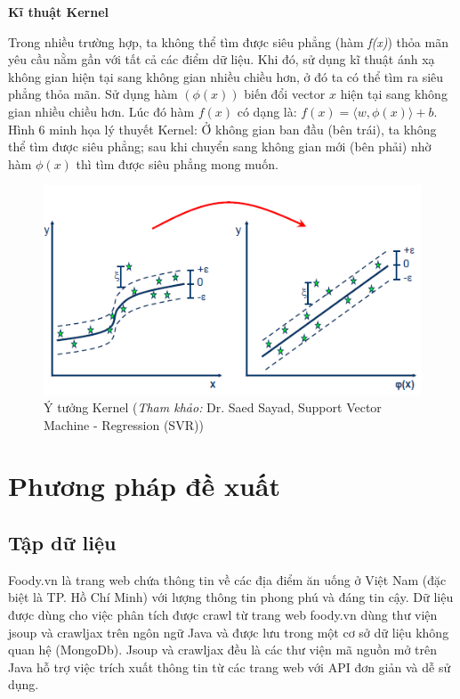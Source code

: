 \documentclass[12pt]{extarticle}
\begin{document}
			\par \textbf{Kĩ thuật Kernel}
			\par Trong nhiều trường hợp, ta không thể tìm được siêu phẳng (hàm \textit{f(x)}) thỏa mãn yêu cầu nằm gần với tất cả các điểm dữ liệu. Khi đó, sử dụng kĩ thuật ánh xạ không gian hiện tại sang không gian nhiều chiều hơn, ở đó ta có thể tìm ra siêu phẳng thỏa mãn. Sử dụng hàm $(\phi(x))$ biến đổi vector $x$ hiện tại sang không gian nhiều chiều hơn. Lúc đó hàm $f(x)$ có dạng là: $f(x)=\langle w,\phi(x)\rangle + b$. Hình 6 minh họa lý thuyết Kernel: Ở không gian ban đầu (bên trái), ta không thể tìm được siêu phẳng; sau khi chuyển sang không gian mới (bên phải) nhờ hàm $\phi(x)$ thì tìm được siêu phẳng mong muốn.
				\begin{figure}[h!]
				\includegraphics[width=\linewidth]{kernel}
				\caption[Ý tưởng Kernel]{Ý tưởng Kernel (\textit{Tham khảo:} Dr. Saed Sayad, Support Vector Machine - Regression (SVR))}
				\label{fig:svr}
			\end{figure}
	\section{Phương pháp đề xuất}								
		\subsection{Tập dữ liệu}
			\par Foody.vn là trang web chứa thông tin về các địa điểm ăn uống ở Việt Nam (đặc biệt là TP. Hồ Chí Minh) với lượng thông tin phong phú và đáng tin cậy. Dữ liệu được dùng cho việc phân tích được crawl từ trang web foody.vn dùng thư viện jsoup và crawljax trên ngôn ngữ Java và được lưu trong một cơ sở dữ liệu không quan hệ (MongoDb). Jsoup và crawljax đều là các thư viện mã nguồn mở trên Java hỗ trợ việc trích xuất thông tin từ các trang web với API đơn giản và dễ sử dụng.
					
\end{document}
